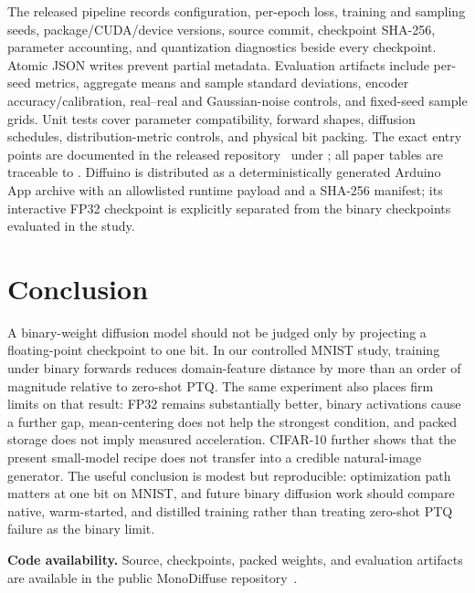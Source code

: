 \documentclass[conference]{IEEEtran}
\begin{document}
The released pipeline records configuration, per-epoch loss, training and sampling
seeds, package/CUDA/device versions, source commit, checkpoint SHA-256, parameter
accounting, and quantization diagnostics beside every checkpoint. Atomic JSON
writes prevent partial metadata. Evaluation artifacts include per-seed metrics,
aggregate means and sample standard deviations, encoder accuracy/calibration,
real--real and Gaussian-noise controls, and fixed-seed sample grids. Unit tests
cover parameter compatibility, forward shapes, diffusion schedules,
distribution-metric controls, and physical bit packing. The exact entry points
are documented in the released repository~\cite{monodiffuseRepo} under
; all paper tables are traceable to
. Diffuino is distributed as a deterministically
generated Arduino App archive with an allowlisted runtime payload and a SHA-256
manifest; its interactive FP32 checkpoint is explicitly separated from the
binary checkpoints evaluated in the study.

\section{Conclusion}

A binary-weight diffusion model should not be judged only by projecting a
floating-point checkpoint to one bit. In our controlled MNIST study, training
under binary forwards reduces domain-feature distance by more than an order of
magnitude relative to zero-shot PTQ. The same experiment also places firm limits
on that result: FP32 remains substantially better, binary activations cause a
further gap, mean-centering does not help the strongest condition, and packed
storage does not imply measured acceleration. CIFAR-10 further shows that the
present small-model recipe does not transfer into a credible natural-image
generator. The useful conclusion is modest but reproducible: optimization path
matters at one bit on MNIST, and future binary
diffusion work should compare native, warm-started, and distilled training rather
than treating zero-shot PTQ failure as the binary limit.

\smallskip\noindent\textbf{Code availability.}
Source, checkpoints, packed weights, and evaluation artifacts are available in
the public MonoDiffuse repository~\cite{monodiffuseRepo}.



\end{document}
